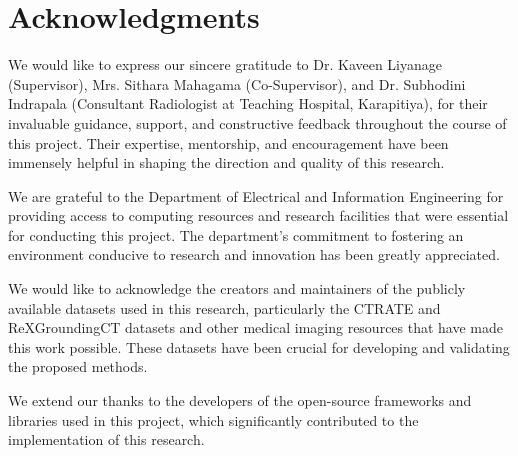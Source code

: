 ﻿
\chapter*{Acknowledgments}

We would like to express our sincere gratitude to Dr. Kaveen Liyanage (Supervisor), Mrs. Sithara Mahagama (Co-Supervisor), and
Dr. Subhodini Indrapala (Consultant Radiologist at Teaching Hospital, Karapitiya), for their invaluable guidance, support, and constructive feedback throughout the
course of this project. Their expertise, mentorship, and encouragement have been immensely helpful in shaping the direction
and quality of this research.

We are grateful to the Department of Electrical and Information Engineering for providing access to computing resources and
research facilities that were essential for conducting this project. The department's commitment to fostering an environment
conducive to research and innovation has been greatly appreciated.

We would like to acknowledge the creators and maintainers of the publicly available datasets used in this research, particularly
the CTRATE and ReXGroundingCT datasets and other medical imaging resources that have made this work possible. These datasets
have been crucial for developing and validating the proposed methods.

We extend our thanks to the developers of the open-source frameworks and libraries used in this project,
which significantly contributed to the implementation of this research.

